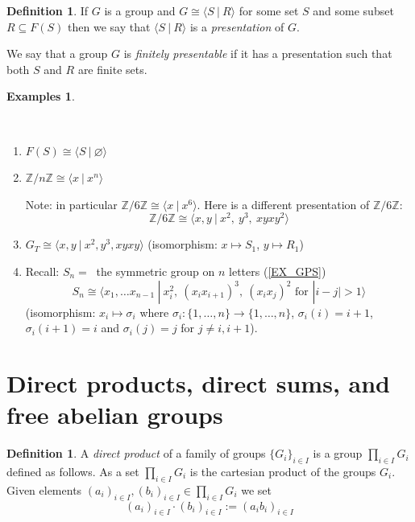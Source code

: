\documentclass[12pt, letterpaper, oneside]{article}
\theoremstyle{plain}
\theoremstyle{definition}
\newtheorem{definition}[theorem]{Definition}
\newtheorem{examples}[theorem]{Examples}
\newcommand{\Z}{{\mathbb Z}}
\newcommand{\subgp}[1]{\langle#1\rangle}
\newcommand{\benu}{\begin{enumerate}}
\newcommand{\eenu}{\end{enumerate}}
\newcommand{\vs}{\vskip 5mm}
\newcommand{\isep}[1][0]{\setlength{\itemsep}{#1 mm}}
\begin{document}
\vs\vs

\begin{definition}
If $G$ is a group and $G \cong \subgp{S \ | \ R}$ for some set $S$ and some subset 
$R\subseteq F(S)$ then we say that $\subgp{S \ | \ R}$ is a \emph{presentation} of $G$.

We say that a group $G$ is \emph{finitely presentable} if it has a presentation such that 
both $S$ and $R$ are finite sets. 
\end{definition}

\vs


\begin{examples} \ 

\vskip -13mm

\ 
\benu
\isep[5]
\item $F(S)\cong \subgp{S \ | \ \varnothing}$
\item $\Z/n\Z \cong \subgp{x \ | \ x^{n}}$ 

Note: in particular $\Z/6\Z \cong \subgp{x \ | \ x^{6}}$. Here is a different presentation of $\Z/6\Z$:
$$ \Z/6\Z\cong \subgp{ x, y \ | \ x^{2},\  y^{3},\  xyxy^{2}}$$ 
\item $G_{T} \cong \subgp{x, y \ | \ x^{2}, y^{3}, xyxy}$ (isomorphism: $x\mapsto S_{1}$, $y\mapsto R_{1}$)
\item Recall: $S_{n}= \ $ the symmetric group on $n$ letters (\ref{EX_GPS})
$$S_{n} \cong \subgp{x_{1}, \dots x_{n-1}\ | \ x_{i}^{2},\  (x_{i}x_{i+1})^{3},\  (x_{i}x_{j})^{2} 
\text{ for } | i-j|>1 }$$
(isomorphism: $x_{i} \mapsto \sigma_{i}$ where $\sigma_{i}\colon \{1, \dots, n\}\to \{1, \dots, n\}$, 
$\sigma_{i}(i)=i+1$, $\sigma_{i}(i+1)=i$ and $\sigma_{i}(j)=j$ for $j\neq i, i+1$).
\eenu

\end{examples}







\newpage
\section{Direct products, direct sums, and free abelian groups}
\label{SEC_FREEABGP}


\begin{definition} 
A \emph{direct product} of a family of groups $\{G_{i}\}_{i\in I}$ is a group
$\prod_{i\in I} G_{i}$ defined as follows.  As a set $\prod_{i\in I} G_{i}$ is the 
cartesian product of the groups $G_{i}$. Given elements $(a_{i})_{i\in I}, (b_{i})_{i\in I}\in \prod_{i\in I} G_{i}$
we set
$$(a_{i})_{i\in I}\cdot (b_{i})_{i\in I} := (a_{i}b_{i})_{i\in I}$$
\end{definition}
\end{document}

